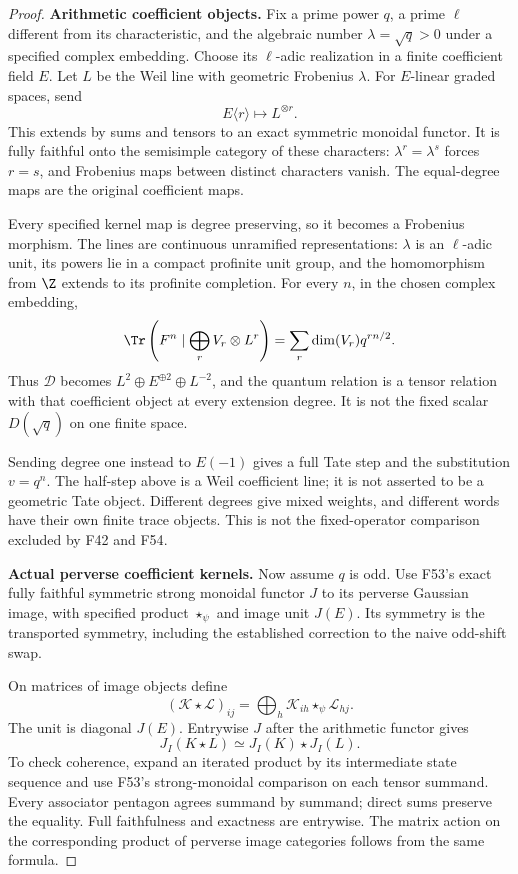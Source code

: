 \documentclass[11pt,a4paper]{article}
\newcommand{\fid}[1]{\textsf{#1}}\newcommand{\gate}[1]{\textsf{#1}}
\theoremstyle{named}\newtheorem{finding}{Finding}[section]
\theoremstyle{definition}\newtheorem{definition}[finding]{Definition}
\theoremstyle{remark}\newtheorem{remark}[finding]{Remark}
\begin{document}
\begin{proof}
\par\smallskip\noindent\textbf{Arithmetic coefficient objects.}\quad
Fix a prime power $q$, a prime $\ell$ different from its
characteristic, and the algebraic number
$\lambda=\sqrt q>0$ under a specified complex embedding.
Choose its $\ell$-adic realization in a finite
coefficient field $E$.
Let $L$ be the Weil line with geometric Frobenius $\lambda$.
For $E$-linear graded spaces, send
\[
 E\langle r\rangle\longmapsto L^{\otimes r}.
\]
This extends by sums and tensors to an exact symmetric
monoidal functor.
It is fully faithful onto the semisimple category of
these characters: $\lambda^r=\lambda^s$ forces $r=s$,
and Frobenius maps between distinct characters vanish.
The equal-degree maps are the original coefficient maps.

Every specified kernel map is degree preserving,
so it becomes a Frobenius morphism.
The lines are continuous unramified representations:
$\lambda$ is an $\ell$-adic unit, its powers lie in a
compact profinite unit group, and the homomorphism
from $\Z$ extends to its profinite completion.
For every $n$, in the chosen complex embedding,
\begin{equation}\label{eq:gradedcoefficienttrace}
 \Tr\left(F^n\mid\bigoplus_r V_r\otimes L^r\right)
       =\sum_r\dim(V_r)q^{rn/2}.
\end{equation}
Thus $\mathcal D$ becomes
$L^2\oplus E^{\oplus2}\oplus L^{-2}$, and the quantum
relation is a tensor relation with that coefficient object
at every extension degree.
It is not the fixed scalar $D(\sqrt q)$ on one finite space.

Sending degree one instead to $E(-1)$ gives a full
Tate step and the substitution $v=q^n$.
The half-step above is a Weil coefficient line;
it is not asserted to be a geometric Tate object.
Different degrees give mixed weights, and different
words have their own finite trace objects.
This is not the fixed-operator comparison excluded
by \fid{F42} and \fid{F54}.

\par\smallskip\noindent\textbf{Actual perverse coefficient kernels.}\quad
Now assume $q$ is odd.
Use \fid{F53}'s exact fully faithful symmetric strong
monoidal functor $J$ to its perverse Gaussian image,
with specified product $\star_\psi$ and image unit $J(E)$.
Its symmetry is the transported symmetry, including
the established correction to the naive odd-shift swap.

On matrices of image objects define
\[
 (\mathcal K\star\mathcal L)_{ij}
       =\bigoplus_h\mathcal K_{ih}
                      \star_\psi\mathcal L_{hj}.
\]
The unit is diagonal $J(E)$.
Entrywise $J$ after the arithmetic functor gives
\[
 J_I(K\star L)\simeq J_I(K)\star J_I(L).
\]
To check coherence, expand an iterated product by its
intermediate state sequence and use F53's strong-monoidal
comparison on each tensor summand.
Every associator pentagon agrees summand by summand;
direct sums preserve the equality.
Full faithfulness and exactness are entrywise.
The matrix action on the corresponding product of
perverse image categories follows from the same formula.


\end{proof}
\end{document}
